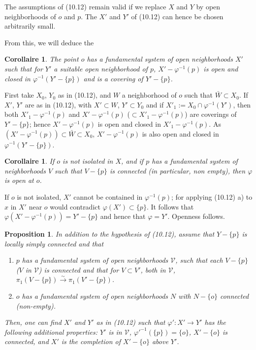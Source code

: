 \documentclass[12pt,a4paper]{article}
\theoremstyle{plain}
\newtheorem{proposition}[theorem]{Proposition}
\newtheorem{corollary}[theorem]{Corollaire}
\theoremstyle{definition}
\theoremstyle{remark}
\begin{document}
The assumptions of (10.12) remain valid if we replace $X$ and $Y$ by open neighborhoods of $o$ and $p$. The $X'$ and $Y'$ of (10.12) can hence be chosen arbitrarily small.

From this, we will deduce the

\begin{corollary}
\label{10.12.2}
The point $o$ has a fundamental system of open neighborhoods $X'$ such that for $Y'$ a suitable open neighborhood of $p$, $X' - \varphi^{-1}(p)$ is open and closed in $\varphi^{-1}(Y' - \{p\})$ and is a covering of $Y' - \{p\}$.
\end{corollary}

First take $X_0$, $Y_0$ as in (10.12), and $W$ a neighborhood of $o$ such that $\bar{W} \subset X_0$. If $X'$, $Y'$ are as in (10.12), with $X' \subset W$, $Y' \subset Y_0$ and if $X'_1 := X_0 \cap \varphi^{-1}(Y')$, then both $X'_1 - \varphi^{-1}(p)$ and $X' - \varphi^{-1}(p)$ ($\subset X'_1 - \varphi^{-1}(p)$) are coverings of $Y' - \{p\}$; hence $X' - \varphi^{-1}(p)$ is open and closed in $X'_1 - \varphi^{-1}(p)$. As $(X' - \varphi^{-1}(p)) \subset \bar{W} \subset X_0$, $X' - \varphi^{-1}(p)$ is also open and closed in $\varphi^{-1}(Y' - \{p\})$.

\begin{corollary}
\label{10.12.3}
If $o$ is not isolated in $X$, and if $p$ has a fundamental system of neighborhoods $V$ such that $V - \{p\}$ is connected (in particular, non empty), then $\varphi$ is open at $o$.
\end{corollary}

If $o$ is not isolated, $X'$ cannot be contained in $\varphi^{-1}(p)$; for applying (10.12) a) to $x$ in $X'$ near $o$ would contradict $\varphi(X') \subset \{p\}$. It follows that $\varphi(X' - \varphi^{-1}(p)) = Y' - \{p\}$ and hence that $\varphi = Y'$. Openness follows.

\begin{proposition}
\label{10.13}
In addition to the hypothesis of (10.12), assume that $Y - \{p\}$ is locally simply connected and that
\begin{enumerate}
\item[c)] $p$ has a fundamental system of open neighborhoods $\mathscr{V}$, such that each $V - \{p\}$ ($V$ in $\mathscr{V}$) is connected and that for $V \subset V'$, both in $\mathscr{V}$, $\pi_1(V - \{p\}) \xrightarrow{\sim} \pi_1(V' - \{p\})$.
\item[d)] $o$ has a fundamental system of open neighborhoods $N$ with $N - \{o\}$ connected (non-empty).
\end{enumerate}
Then, one can find $X'$ and $Y'$ as in (10.12) such that $\varphi' : X' \to Y'$ has the following additional properties: $Y'$ is in $\mathscr{V}$, $\varphi'^{-1}(\{p\}) = \{o\}$, $X' - \{o\}$ is connected, and $X'$ is the completion of $X' - \{o\}$ above $Y'$.
\end{proposition}
\end{document}
